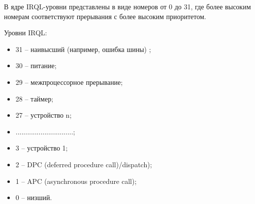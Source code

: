 В ядре IRQL-уровни представлены в виде номеров от 0 до 31, где более высоким номерам соответствуют прерывания с более высоким приоритетом.

Уровни IRQL:
\begin{itemize}
	\item 31 -- наивысший (например, ошибка шины) ;
	\item 30 -- питание;
	\item 29 -- межпроцессорное прерывание;
	\item 28 -- таймер;
	\item 27 -- устройство n;
	\item ..............................;
	\item 3 -- устройство 1;
	\item 2 -- DPC (deferred procedure call)/dispatch);
	\item 1 -- APC (asynchronous procedure call);
	\item 0 -- низший.
\end{itemize}